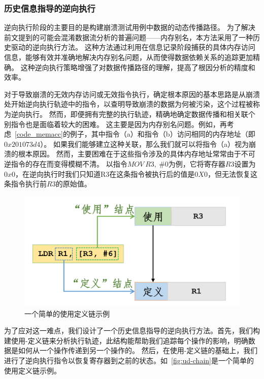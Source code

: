 \subsubsection{历史信息指导的逆向执行}
逆向执行阶段的主要目的是构建崩溃测试用例中数据的动态传播路径。
为了解决前文提到的可能会混淆数据流分析的普遍问题——内存别名，本方法采用了一种历史驱动的逆向执行方法。
这种方法通过利用在信息记录阶段捕获的具体内存访问信息，能够有效并准确地解决内存别名问题，从而使得数据依赖关系的追踪更加精确。
这种逆向执行策略增强了对数据传播路径的理解，提高了根因分析的精度和效率。

对于导致崩溃的无效内存访问或无效指令执行，确定根本原因的基本思路是从崩溃处开始逆向执行轨迹中的指令，以查明导致崩溃的数据为何被污染，这个过程被称为逆向执行。
然而，即便拥有完整的执行轨迹，精确地确定数据传播和相关联个别指令也是面临着较大的困难。
这主要是因为内存别名问题。例如，再考虑~\autoref{code_memacc}的例子，其中指令（a）和指令（b）访问相同的内存地址（即$0x201073d4$）。
如果我们能够建立这种关联，那么我们就可以将指令（a）视为崩溃的根本原因。
然而，主要困难在于这些指令涉及的具体内存地址常常由于不可逆指令的存在而变得模糊不清。
以指令$MOV\ R3,\ \#0$为例，它将寄存器$R3$设置为$0x0$，在逆向执行时我们只知道R3在这条指令被执行后的值是$0X0$，但无法恢复这条指令执行前$R3$的原始值。

\begin{figure}[h]
    \centering
    \includegraphics[width=1.0\textwidth]{./figure/UD-Chain.png}
    \caption{一个简单的使用定义链示例}
    \label{fig:ud-chain}
\end{figure}

为了应对这一难点，我们设计了一个历史信息指导的逆向执行方法。首先，我们构建使用-定义链来分析执行轨迹，此结构能帮助我们追踪每个操作的影响，明确数据是如何从一个操作传递到另一个操作的。
然后，在使用-定义链的基础上，我们进行了逆向执行指令以恢复寄存器到之前的状态。如~\autoref{fig:ud-chain}是一个简单的使用定义链示例。

